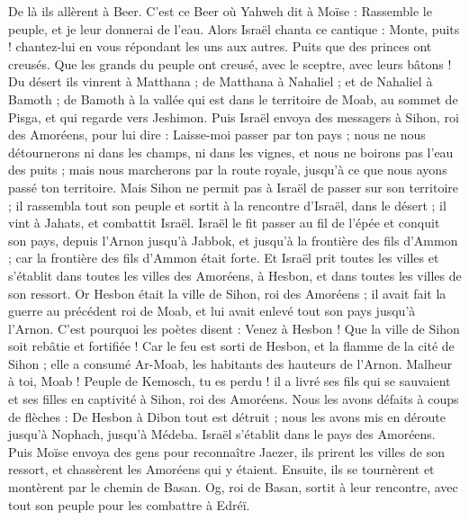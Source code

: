 \begin{multicols}{2}
De là ils allèrent à Beer. C'est ce Beer où Yahweh dit à Moïse : Rassemble le peuple, et je leur donnerai de l'eau.
Alors Israël chanta ce cantique : Monte, puits ! chantez-lui en vous répondant les uns aux autres.
Puits que des princes ont creusés. Que les grands du peuple ont creusé, avec le sceptre, avec leurs bâtons ! Du désert ils vinrent à Matthana ;
de Matthana à Nahaliel ; et de Nahaliel à Bamoth ;
de Bamoth à la vallée qui est dans le territoire de Moab, au sommet de Pisga, et qui regarde vers Jeshimon.
Puis Israël envoya des messagers à Sihon, roi des Amoréens, pour lui dire :
Laisse-moi passer par ton pays ; nous ne nous détournerons ni dans les champs, ni dans les vignes, et nous ne boirons pas l'eau des puits ; mais nous marcherons par la route royale, jusqu'à ce que nous ayons passé ton territoire.
Mais Sihon ne permit pas à Israël de passer sur son territoire ; il rassembla tout son peuple et sortit à la rencontre d'Israël, dans le désert ; il vint à Jahats, et combattit Israël.
Israël le fit passer au fil de l'épée et conquit son pays, depuis l'Arnon jusqu'à Jabbok, et jusqu'à la frontière des fils d'Ammon ; car la frontière des fils d'Ammon était forte.
Et Israël prit toutes les villes et s'établit dans toutes les villes des Amoréens, à Hesbon, et dans toutes les villes de son ressort.
Or Hesbon était la ville de Sihon, roi des Amoréens ; il avait fait la guerre au précédent roi de Moab, et lui avait enlevé tout son pays jusqu'à l'Arnon.
C'est pourquoi les poètes disent : Venez à Hesbon ! Que la ville de Sihon soit rebâtie et fortifiée !
Car le feu est sorti de Hesbon, et la flamme de la cité de Sihon ; elle a consumé Ar-Moab, les habitants des hauteurs de l'Arnon.
Malheur à toi, Moab ! Peuple de Kemosch, tu es perdu ! il a livré ses fils qui se sauvaient et ses filles en captivité à Sihon, roi des Amoréens.
Nous les avons défaits à coups de flèches : De Hesbon à Dibon tout est détruit ; nous les avons mis en déroute jusqu'à Nophach, jusqu'à Médeba.
Israël s'établit dans le pays des Amoréens.
Puis Moïse envoya des gens pour reconnaître Jaezer, ils prirent les villes de son ressort, et chassèrent les Amoréens qui y étaient.
Ensuite, ils se tournèrent et montèrent par le chemin de Basan. Og, roi de Basan, sortit à leur rencontre, avec tout son peuple pour les combattre à Edréï.

\end{multicols}
